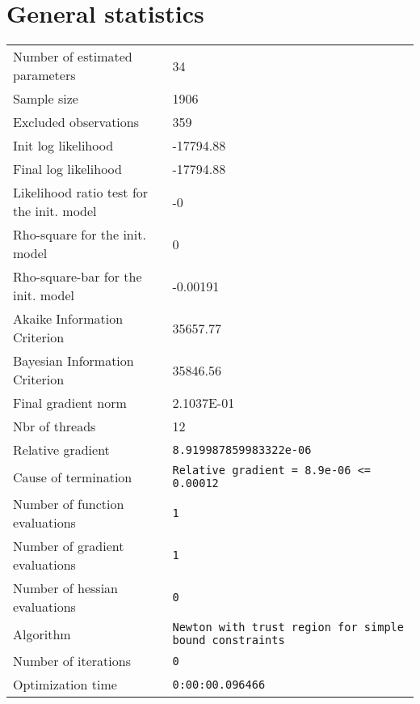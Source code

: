 



\section{General statistics}
\begin{tabular}{ll}
Number of estimated parameters & 34 \\
Sample size & 1906 \\
Excluded observations & 359 \\
Init log likelihood & -17794.88 \\
Final log likelihood & -17794.88 \\
Likelihood ratio test for the init. model & -0 \\
Rho-square for the init. model & 0 \\
Rho-square-bar for the init. model & -0.00191 \\
Akaike Information Criterion & 35657.77 \\
Bayesian Information Criterion & 35846.56 \\
Final gradient norm & 2.1037E-01 \\
Nbr of threads & 12 \\
Relative gradient & \verb$8.919987859983322e-06$ \\
Cause of termination & \verb$Relative gradient = 8.9e-06 <= 0.00012$ \\
Number of function evaluations & \verb$1$ \\
Number of gradient evaluations & \verb$1$ \\
Number of hessian evaluations & \verb$0$ \\
Algorithm & \verb$Newton with trust region for simple bound constraints$ \\
Number of iterations & \verb$0$ \\
Optimization time & \verb$0:00:00.096466$ \\
\end{tabular}

